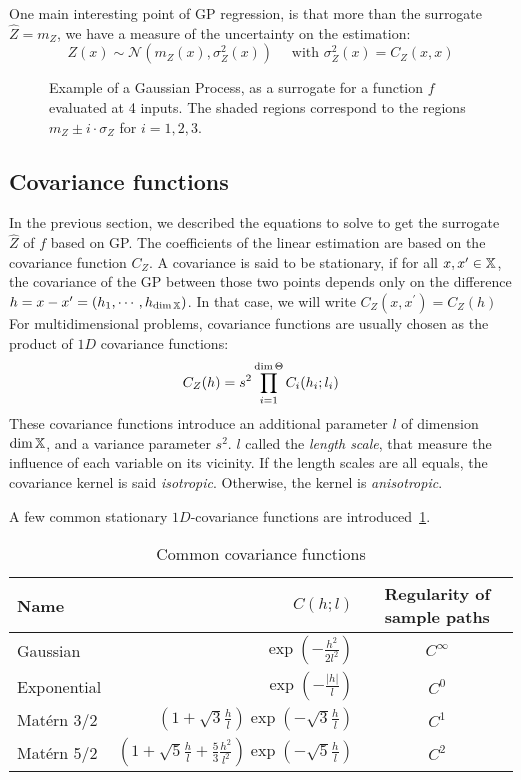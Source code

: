 \documentclass[../../Main_ManuscritThese.tex]{subfiles}
\newcommand\imgpath{/home/victor/acadwriting/Manuscrit/Text/Chapter4/img/}
\begin{document}
One main interesting point of GP regression, is that more than the surrogate $\hat{Z} = m_Z$, we have a measure of the uncertainty on the estimation:
\begin{equation}
  Z(x) \sim \mathcal{N}\left(m_Z(x), \sigma^2_Z(x)\right) \quad \text{ with } \sigma^2_Z(x) = C_Z(x, x)
\end{equation}

\begin{figure}[ht]
  \centering
  
  \caption{\label{fig:example_GP} Example of a Gaussian Process, as a surrogate for a function $f$ evaluated at 4 inputs. The shaded regions correspond to the regions $m_Z \pm i \cdot \sigma_Z$ for $i=1, 2,3$.}
\end{figure}


\subsection{Covariance functions}
\label{sec:cov_fun}
In the previous section, we described the equations to solve to get the surrogate $\hat{Z}$ of $f$ based on GP.
The coefficients of the linear estimation are based on the covariance function $C_Z$.
A covariance is said to be stationary, if for all $x, x^{\prime} \in \mathbb{X}$, the covariance of the GP between those two points depends only on the  difference $h = x-x^{\prime}=(h_1,\cdots, h_{\dim\mathbb{X}})$. In that case, we will write $C_Z(x, x^{\prime}) = C_Z(h)$ 
For multidimensional problems, covariance functions are usually chosen as the product of $1D$ covariance functions:
\begin{equation}
  C_Z(h) = s^2\prod_{i=1}^{\dim \Theta} C_i(h_i;l_i)
\end{equation}
These covariance functions introduce an additional parameter $l$ of dimension $\dim \mathbb{X}$, and a variance parameter $s^2$.
$l$ called the \emph{length scale}, that measure the influence of each variable on its vicinity. If the length scales are all equals, the covariance kernel is said \emph{isotropic}. Otherwise, the kernel is \emph{anisotropic}.

A few common stationary $1D$-covariance functions are introduced~\cref{tab:common_cov_fc}.

  \begin{table}[ht]
    \centering
    \begin{tabular}{lrc}
      \toprule
      Name & $C(h;l)$ & Regularity of sample paths\\ \midrule
      Gaussian & $\exp\left(- \frac{h^2}{2 l^2}\right)$ & $C^{\infty}$\\
      Exponential &$\exp\left(- \frac{\lvert h \rvert}{l}\right)$ & $C^0$  \\
      Matérn 3/2 & $\left(1 + \sqrt{3}\frac{h}{l}\right)\exp\left(-\sqrt{3}\frac{h}{l}\right)$ & $C^1$\\
      Matérn 5/2 & $\left(1+ \sqrt{5}\frac{h}{l} + \frac{5}{3}\frac{h^2}{l^2}\right) \exp\left(-\sqrt{5}\frac{h}{l}\right)$ & $C^2$\\ \bottomrule
    \end{tabular}
    \caption{\label{tab:common_cov_fc} Common covariance functions}
  \end{table}
\end{document}
